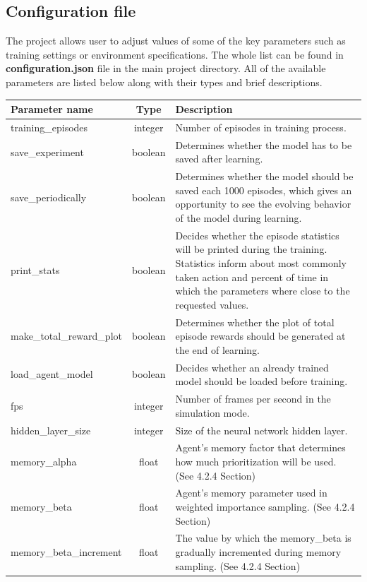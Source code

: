 \documentclass{article}
\begin{document}
\subsection{Configuration file}
The project allows user to adjust values of some of the key parameters such as training settings or environment specifications. The whole list can be found in \textbf{configuration.json} file in the main project directory. All of the available parameters are listed below along with their types and brief descriptions.
{\def\arraystretch{1.2}\tabcolsep=5pt
\begin{longtable}{l|c|p{9cm}}
	\hline
	\textbf{Parameter name} & \textbf{Type} & \textbf{Description} \\
	\hline
    training\_episodes & integer & Number of episodes in training process.\\
    \hline
    save\_experiment & boolean & Determines whether the model has to be saved after learning.\\
    \hline
    save\_periodically & boolean & Determines whether the model should be saved each 1000 episodes, which gives an opportunity to see the evolving behavior of the model during learning.\\
    \hline
    print\_stats & boolean & Decides whether the episode statistics will be printed during the training. Statistics inform about most commonly taken action and percent of time in which the parameters where close to the requested values.\\
    \hline
    make\_total\_reward\_plot & boolean & Determines whether the plot of total episode rewards should be generated at the end of learning.\\
    \hline
    load\_agent\_model & boolean & Decides whether an already trained model should be loaded before training.\\
    \hline
    fps & integer & Number of frames per second in the simulation mode.\\
    \hline
    hidden\_layer\_size & integer & Size of the neural network hidden layer.\\
    \hline
    memory\_alpha & float & Agent's memory factor that determines how much prioritization will be used. (See 4.2.4 Section)\\
    \hline
    memory\_beta & float & Agent's memory parameter used in weighted importance sampling. (See 4.2.4 Section)\\
    \hline
    memory\_beta\_increment & float & The value by which the memory\_beta is gradually incremented during memory sampling. (See 4.2.4 Section)\\

\end{longtable}}
\end{document}
